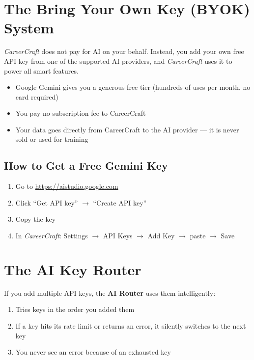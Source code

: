 \documentclass[12pt, a4paper]{report}
\newcommand{\cc}{\textit{CareerCraft}}
\begin{document}
\section{The Bring Your Own Key (BYOK) System}

\cc{} does not pay for AI on your behalf.  Instead, you add your own free API
key from one of the supported AI providers, and \cc{} uses it to power all
smart features.

\begin{notebox}
\begin{itemize}
  \item Google Gemini gives you a generous free tier (hundreds of uses per month, no card required)
  \item You pay no subscription fee to CareerCraft
  \item Your data goes directly from CareerCraft to the AI provider --- it is never sold or used for training
\end{itemize}
\end{notebox}

\subsection{How to Get a Free Gemini Key}
\begin{enumerate}
  \item Go to \url{https://aistudio.google.com}
  \item Click ``Get API key'' $\to$ ``Create API key''
  \item Copy the key
  \item In \cc{}: Settings $\to$ API Keys $\to$ Add Key $\to$ paste $\to$ Save
\end{enumerate}

\section{The AI Key Router}

If you add multiple API keys, the \textbf{AI Router} uses them intelligently:
\begin{enumerate}
  \item Tries keys in the order you added them
  \item If a key hits its rate limit or returns an error, it silently switches to the next key
  \item You never see an error because of an exhausted key
\end{enumerate}
\end{document}
